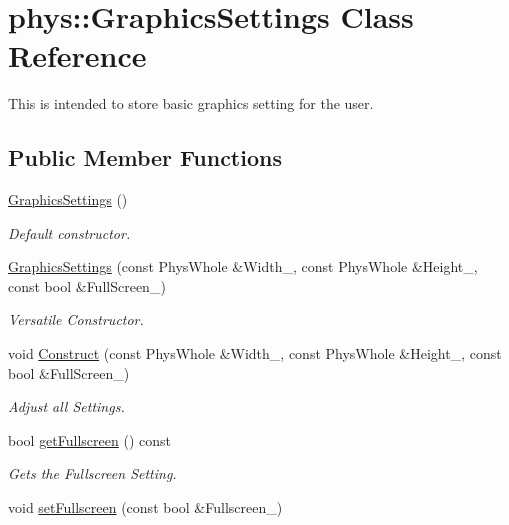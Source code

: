 \hypertarget{classphys_1_1GraphicsSettings}{
\section{phys::GraphicsSettings Class Reference}
\label{dc/df1/classphys_1_1GraphicsSettings}
}


This is intended to store basic graphics setting for the user.  
\subsection*{Public Member Functions}
\begin{DoxyCompactItemize}
\item 
\hyperlink{classphys_1_1GraphicsSettings_aceaaf53585413067adbf271e2c1e48fa}{GraphicsSettings} ()
\begin{DoxyCompactList}\small\item\em Default constructor. \item\end{DoxyCompactList}\item 
\hyperlink{classphys_1_1GraphicsSettings_a58d20902f41ddf10db9f9a810a3910cc}{GraphicsSettings} (const PhysWhole \&Width\_\-, const PhysWhole \&Height\_\-, const bool \&FullScreen\_\-)
\begin{DoxyCompactList}\small\item\em Versatile Constructor. \item\end{DoxyCompactList}\item 
void \hyperlink{classphys_1_1GraphicsSettings_aa8107167a2094f757f409db36e088171}{Construct} (const PhysWhole \&Width\_\-, const PhysWhole \&Height\_\-, const bool \&FullScreen\_\-)
\begin{DoxyCompactList}\small\item\em Adjust all Settings. \item\end{DoxyCompactList}\item 
bool \hyperlink{classphys_1_1GraphicsSettings_a8871ea7d5c65c3b59d1d34b59531743f}{getFullscreen} () const 
\begin{DoxyCompactList}\small\item\em Gets the Fullscreen Setting. \item\end{DoxyCompactList}\item 
void \hyperlink{classphys_1_1GraphicsSettings_aba9e127ab2cf3f20604313e39d32f7a8}{setFullscreen} (const bool \&Fullscreen\_\-)

\end{DoxyCompactItemize}
